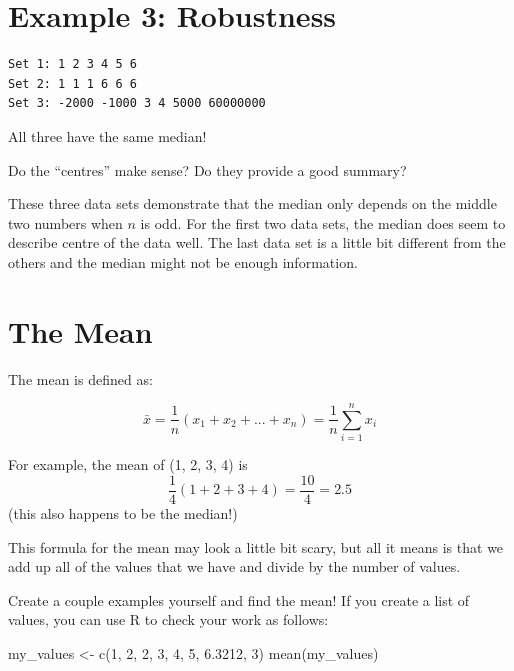 \documentclass[
  letterpaper,
  DIV=11,
  numbers=noendperiod]{scrreprt}
\newenvironment{Shaded}{\begin{snugshade}}{\end{snugshade}}
\newcommand{\DecValTok}[1]{\textcolor[rgb]{0.68,0.00,0.00}{#1}}
\newcommand{\FloatTok}[1]{\textcolor[rgb]{0.68,0.00,0.00}{#1}}
\newcommand{\FunctionTok}[1]{\textcolor[rgb]{0.28,0.35,0.67}{#1}}
\newcommand{\NormalTok}[1]{\textcolor[rgb]{0.00,0.23,0.31}{#1}}
\newcommand{\OtherTok}[1]{\textcolor[rgb]{0.00,0.23,0.31}{#1}}
\begin{document}
\hypertarget{example-3-robustness}{%
\section{Example 3: Robustness}\label{example-3-robustness}}

\begin{verbatim}
Set 1: 1 2 3 4 5 6
Set 2: 1 1 1 6 6 6
Set 3: -2000 -1000 3 4 5000 60000000
\end{verbatim}

All three have the same median!

\pspace

Do the ``centres'' make sense? Do they provide a good summary?

These three data sets demonstrate that the median only depends on the
middle two numbers when \(n\) is odd. For the first two data sets, the
median does seem to describe centre of the data well. The last data set
is a little bit different from the others and the median might not be
enough information.

\hypertarget{the-mean}{%
\section{The Mean}\label{the-mean}}

The mean is defined as:

\[
\bar x = \frac{1}{n}(x_1 + x_2 + ... + x_n)= \frac{1}{n}\sum_{i=1}^nx_i
\]

For example, the mean of (1, 2, 3, 4) is \[
\frac{1}{4}(1 + 2 + 3 + 4) = \frac{10}{4} = 2.5
\] (this also happens to be the median!)

This formula for the mean may look a little bit scary, but all it means
is that we add up all of the values that we have and divide by the
number of values.

Create a couple examples yourself and find the mean! If you create a
list of values, you can use R to check your work as follows:

\begin{Shaded}
\begin{Highlighting}[]
\NormalTok{my\_values }\OtherTok{\textless{}{-}} \FunctionTok{c}\NormalTok{(}\DecValTok{1}\NormalTok{, }\DecValTok{2}\NormalTok{, }\DecValTok{2}\NormalTok{, }\DecValTok{3}\NormalTok{, }\DecValTok{4}\NormalTok{, }\DecValTok{5}\NormalTok{, }\FloatTok{6.3212}\NormalTok{, }\DecValTok{3}\NormalTok{)}
\FunctionTok{mean}\NormalTok{(my\_values)}
\end{Highlighting}
\end{Shaded}
\end{document}
